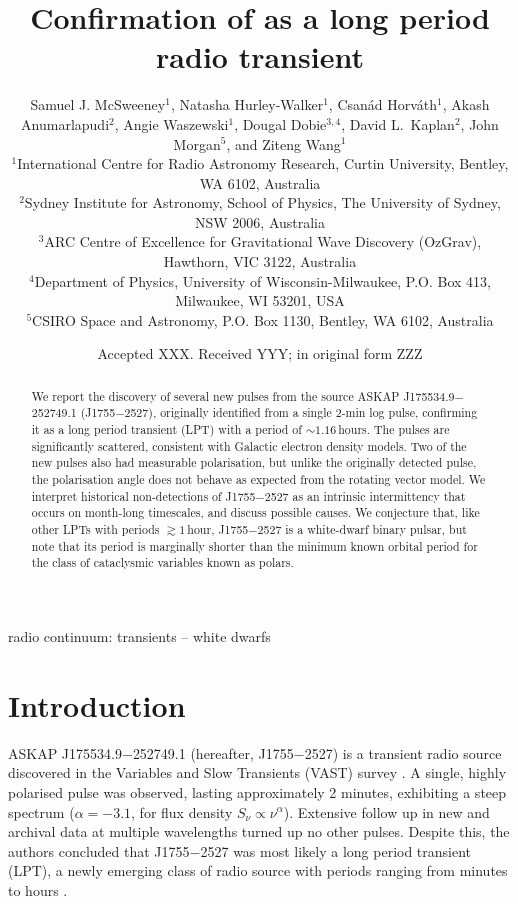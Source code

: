\documentclass[fleqn,usenatbib]{mnras}
\title[Confirmation of \src{} as LPT]{Confirmation of \srcfull{} as a long period radio transient}
\author[S. J. McSweeney et al.]{
Samuel J. McSweeney$^{1}$,
Natasha Hurley-Walker$^{1}$,
Csan\'{a}d Horv\'{a}th$^{1}$,
Akash Anumarlapudi$^{2}$,
\newauthor
Angie Waszewski$^{1}$,
Dougal Dobie$^{3,4}$,
David L.~Kaplan$^{2}$,
John Morgan$^{5}$,
and Ziteng Wang$^{1}$
\\
$^{1}$International Centre for Radio Astronomy Research, Curtin University, Bentley, WA 6102, Australia\\
$^{2}$Sydney Institute for Astronomy, School of Physics, The University of Sydney, NSW 2006, Australia\\
$^{3}$ARC Centre of Excellence for Gravitational Wave Discovery (OzGrav), Hawthorn, VIC 3122, Australia\\
$^{4}$Department of Physics, University of Wisconsin-Milwaukee, P.O. Box 413, Milwaukee, WI 53201, USA\\
$^{5}$CSIRO Space and Astronomy, P.O. Box 1130, Bentley, WA 6102, Australia\\
}
\date{Accepted XXX. Received YYY; in original form ZZZ}
\newcommand{\src}{J1755$-$2527}
\newcommand{\srcfull}{ASKAP J175534.9$-$252749.1}
\begin{document}
\label{firstpage}
\pagerange{\pageref{firstpage}--\pageref{lastpage}}
\maketitle

\begin{abstract}
We report the discovery of several new pulses from the source \srcfull{} (\src{}), originally identified from a single 2-min log pulse, confirming it as a long period transient (LPT) with a period of ${\sim}1.16\,$hours. The pulses are significantly scattered, consistent with Galactic electron density models. Two of the new pulses also had measurable polarisation, but unlike the originally detected pulse, the polarisation angle does not behave as expected from the rotating vector model. We interpret historical non-detections of \src{} as an intrinsic intermittency that occurs on month-long timescales, and discuss possible causes. We conjecture that, like other LPTs with periods $\gtrsim 1\,$hour, \src{} is a white-dwarf binary pulsar, but note that its period is marginally shorter than the minimum known orbital period for the class of cataclysmic variables known as polars.
\end{abstract}

\begin{keywords}
radio continuum: transients -- white dwarfs
\end{keywords}



\section{Introduction} \label{sec:introduction}

\srcfull{} (hereafter, \src{}) is a transient radio source discovered \citep[][hereafter ]{2024MNRAS.535..909D} in the Variables and Slow Transients (VAST) survey \citep{2013PASA...30....6M}.
A single, highly polarised pulse was observed, lasting approximately 2 minutes, exhibiting a steep spectrum ($\alpha = -3.1$, for flux density $S_\nu\propto\nu^\alpha$).
Extensive follow up in new and archival data at multiple wavelengths turned up no other pulses.
Despite this, the authors concluded that \src{} was most likely a long period transient (LPT), a newly emerging class of radio source with periods ranging from minutes to hours \citep[see e.g.][]{2022Natur.601..526H,2023Natur.619..487H,2024NatAs...8.1159C}.
\end{document}
